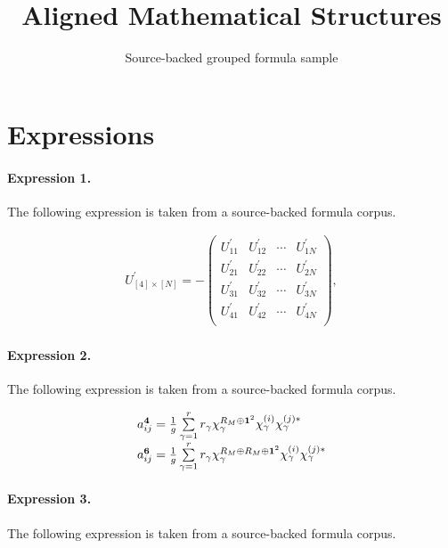 \documentclass[11pt]{article}
\title{Aligned Mathematical Structures}
\author{Source-backed grouped formula sample}
\date{}
\begin{document}
\maketitle
\section{Expressions}
\paragraph{Expression 1.} The following expression is taken from a source-backed formula corpus.

\begin{align*}U^{\prime}_{[4]\times[N]} = - \left( \! \begin{array}{cccc} U^{\prime}_{11} & U^{\prime}_{12} & \cdots & U^{\prime}_{1N} \\U^{\prime}_{21} & U^{\prime}_{22} & \cdots & U^{\prime}_{2N} \\U^{\prime}_{31} & U^{\prime}_{32} & \cdots & U^{\prime}_{3N} \\U^{\prime}_{41} & U^{\prime}_{42} & \cdots & U^{\prime}_{4N} \\\end{array} \! \right),\end{align*}

\paragraph{Expression 2.} The following expression is taken from a source-backed formula corpus.

\begin{align*}\begin{array}{l}a_{ij}^{{\bf 4}}= \frac{1}{g}\sum\limits_{\gamma=1}^{r}r_{\gamma }\chi_{\gamma }^{R_M \oplus {\bf 1}^2 }\chi_{\gamma }^{(i)}\chi_{\gamma }^{(j)*} \\a_{ij}^{{\bf 6}}=\frac{1}{g}\sum\limits_{\gamma=1}^{r}r_{\gamma }\chi_{\gamma }^{R_M \oplus R_M \oplus {\bf 1}^2 }\chi_{\gamma }^{(i)}\chi_{\gamma }^{(j)*} \\\end{array}\end{align*}

\paragraph{Expression 3.} The following expression is taken from a source-backed formula corpus.
\end{document}
